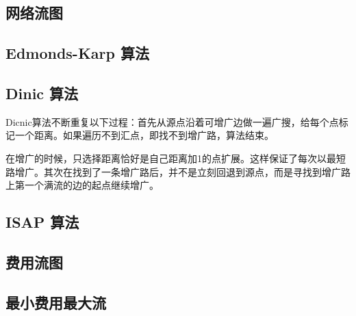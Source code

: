 \subsection{网络流图}


\subsection{Edmonds-Karp 算法}


\subsection{Dinic 算法}

Dicnic算法不断重复以下过程：首先从源点沿着可增广边做一遍广搜，给每个点标记一个距离。如果遍历不到汇点，即找不到增广路，算法结束。

在增广的时候，只选择距离恰好是自己距离加1的点扩展。这样保证了每次以最短路增广。其次在找到了一条增广路后，并不是立刻回退到源点，而是寻找到增广路上第一个满流的边的起点继续增广。



\subsection{ISAP 算法}


\subsection{费用流图}


\subsection{最小费用最大流}

